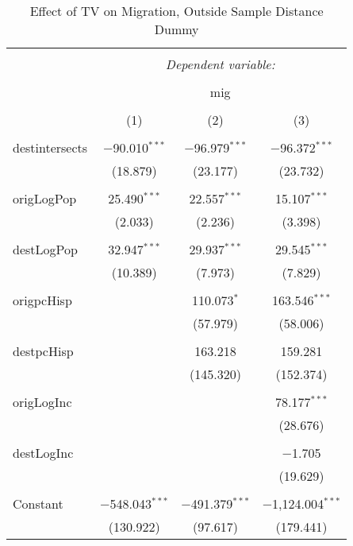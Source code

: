 
\begin{table}[!htbp] \centering 
  \caption{Effect of TV on Migration, Outside Sample Distance Dummy} 
  \label{} 
\begin{tabular}{@{\extracolsep{5pt}}lccc} 
\\[-1.8ex]\hline 
\hline \\[-1.8ex] 
 & \multicolumn{3}{c}{\textit{Dependent variable:}} \\ 
\cline{2-4} 
\\[-1.8ex] & \multicolumn{3}{c}{mig} \\ 
\\[-1.8ex] & (1) & (2) & (3)\\ 
\hline \\[-1.8ex] 
 destintersects & $-$90.010$^{***}$ & $-$96.979$^{***}$ & $-$96.372$^{***}$ \\ 
  & (18.879) & (23.177) & (23.732) \\ 
  & & & \\ 
 origLogPop & 25.490$^{***}$ & 22.557$^{***}$ & 15.107$^{***}$ \\ 
  & (2.033) & (2.236) & (3.398) \\ 
  & & & \\ 
 destLogPop & 32.947$^{***}$ & 29.937$^{***}$ & 29.545$^{***}$ \\ 
  & (10.389) & (7.973) & (7.829) \\ 
  & & & \\ 
 origpcHisp &  & 110.073$^{*}$ & 163.546$^{***}$ \\ 
  &  & (57.979) & (58.006) \\ 
  & & & \\ 
 destpcHisp &  & 163.218 & 159.281 \\ 
  &  & (145.320) & (152.374) \\ 
  & & & \\ 
 origLogInc &  &  & 78.177$^{***}$ \\ 
  &  &  & (28.676) \\ 
  & & & \\ 
 destLogInc &  &  & $-$1.705 \\ 
  &  &  & (19.629) \\ 
  & & & \\ 
 Constant & $-$548.043$^{***}$ & $-$491.379$^{***}$ & $-$1,124.004$^{***}$ \\ 
  & (130.922) & (97.617) & (179.441) \\ 

\end{tabular}
\end{table}

